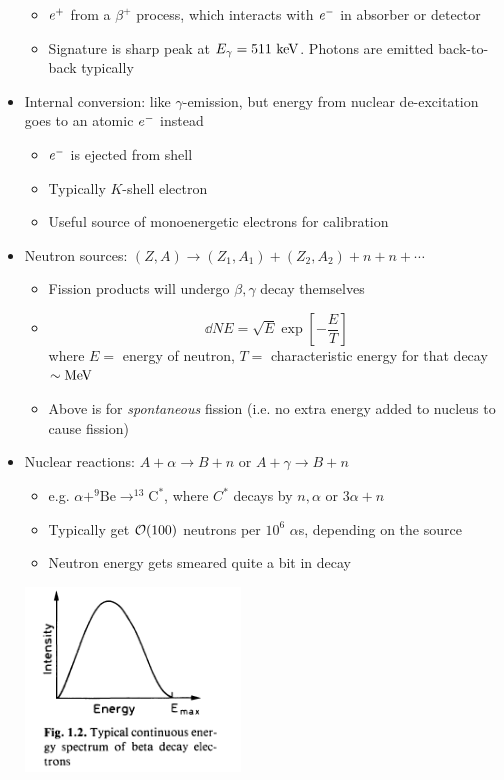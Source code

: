 \begin{itemize}
  \begin{itemize}
    \item $e^{+}$ from a $\beta^+$ process, which interacts with $e^{-}$ in absorber or detector
    \item Signature is sharp peak at $E_\gamma = 511~\text{keV}$. Photons are emitted back-to-back typically
  \end{itemize}
  \item Internal conversion: like $\gamma$-emission, but energy from nuclear de-excitation goes to an atomic $e^{-}$ instead
  \begin{itemize}
    \item $e^{-}$ is ejected from shell
    \item Typically $K$-shell electron
    \item Useful source of monoenergetic electrons for calibration
  \end{itemize}
  \item Neutron sources: $(Z,A)\rightarrow (Z_1,A_1)  + (Z_2,A_2) + n + n + \cdots$
  \begin{itemize}
    \item Fission products will undergo $\beta,\gamma$ decay themselves
    \item 
    \begin{equation}
      \dd{N}{E} = \sqrt{E} \exp \left[-\frac{E}{T}\right]
    \end{equation}
    where $E =$ energy of neutron, $T =$ characteristic energy for that decay $\sim\text{MeV}$
    \item Above is for \emph{spontaneous} fission (i.e. no extra energy added to nucleus to cause fission)
  \end{itemize}
  \item Nuclear reactions: $A+\alpha\rightarrow B+n$ or $A+\gamma \rightarrow B+n$
  \begin{itemize}
    \item e.g. $\alpha + ^9\text{Be} \rightarrow ^{13}\text{C}^*$, where $C^*$ decays by $n,\alpha$ or $3\alpha+n$
    \item Typically get $\mathcal{O}(100)$ neutrons per $10^6$ $\alpha$s, depending on the source
    \item Neutron energy gets smeared quite a bit in decay
  \end{itemize}
\begin{center}
  \includegraphics[width=0.45\textwidth,valign=t]{figs/q_beta.png}

\end{center}
\end{itemize}
